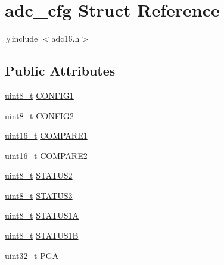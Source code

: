 \hypertarget{structadc__cfg}{}\section{adc\+\_\+cfg Struct Reference}
\label{structadc__cfg}


{\ttfamily \#include $<$adc16.\+h$>$}

\subsection*{Public Attributes}
\begin{DoxyCompactItemize}
\item 
\hyperlink{_p_e___types_8h_aba7bc1797add20fe3efdf37ced1182c5}{uint8\+\_\+t} \hyperlink{structadc__cfg_a3d6b4a9478cafdee4e7a46beab3c0597}{C\+O\+N\+F\+I\+G1}
\item 
\hyperlink{_p_e___types_8h_aba7bc1797add20fe3efdf37ced1182c5}{uint8\+\_\+t} \hyperlink{structadc__cfg_a7a58f1efd0fdb205cc82cc06adcd71b2}{C\+O\+N\+F\+I\+G2}
\item 
\hyperlink{_p_e___types_8h_a1f1825b69244eb3ad2c7165ddc99c956}{uint16\+\_\+t} \hyperlink{structadc__cfg_a742f5e0419fc115709222b4f5129384d}{C\+O\+M\+P\+A\+R\+E1}
\item 
\hyperlink{_p_e___types_8h_a1f1825b69244eb3ad2c7165ddc99c956}{uint16\+\_\+t} \hyperlink{structadc__cfg_ae2cbcfb9ef47bef2913d441b28b06572}{C\+O\+M\+P\+A\+R\+E2}
\item 
\hyperlink{_p_e___types_8h_aba7bc1797add20fe3efdf37ced1182c5}{uint8\+\_\+t} \hyperlink{structadc__cfg_afbc3fd30cb4d69b01da264f1cd08c346}{S\+T\+A\+T\+U\+S2}
\item 
\hyperlink{_p_e___types_8h_aba7bc1797add20fe3efdf37ced1182c5}{uint8\+\_\+t} \hyperlink{structadc__cfg_a147712e3dd9d8cb5dfbbdebaa2a201db}{S\+T\+A\+T\+U\+S3}
\item 
\hyperlink{_p_e___types_8h_aba7bc1797add20fe3efdf37ced1182c5}{uint8\+\_\+t} \hyperlink{structadc__cfg_a2fc37049fe67234135c4f18dfa94cbba}{S\+T\+A\+T\+U\+S1A}
\item 
\hyperlink{_p_e___types_8h_aba7bc1797add20fe3efdf37ced1182c5}{uint8\+\_\+t} \hyperlink{structadc__cfg_ad7d6f39059955d2a403dcfd5feeec073}{S\+T\+A\+T\+U\+S1B}
\item 
\hyperlink{_p_e___types_8h_a33594304e786b158f3fb30289278f5af}{uint32\+\_\+t} \hyperlink{structadc__cfg_a1d628ac45e7b90529d1f055af07639ae}{P\+GA}
\end{DoxyCompactItemize}


